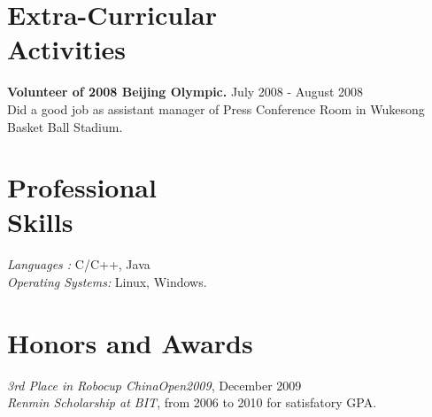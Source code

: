 \documentclass[margin]{res}
\begin{document}
\begin{resume}
\section{Extra-Curricular \\ Activities} 
				{ \bf Volunteer of 2008 Beijing Olympic.} \hfill July 2008 - August 2008 \\  		
                 Did a good job as assistant manager of Press Conference Room in Wukesong Basket Ball Stadium.

\section{Professional \\ Skills} {\sl Languages :} C/C++, Java\\
                {\sl Operating Systems:} Linux, Windows.

\section{Honors and Awards }             
             {\it 3rd Place in Robocup ChinaOpen2009}, 	December	2009 \\             			
			 {\it Renmin Scholarship at BIT}, from 2006 to 2010 for satisfatory GPA.			  				

\end{resume}
\end{document}
